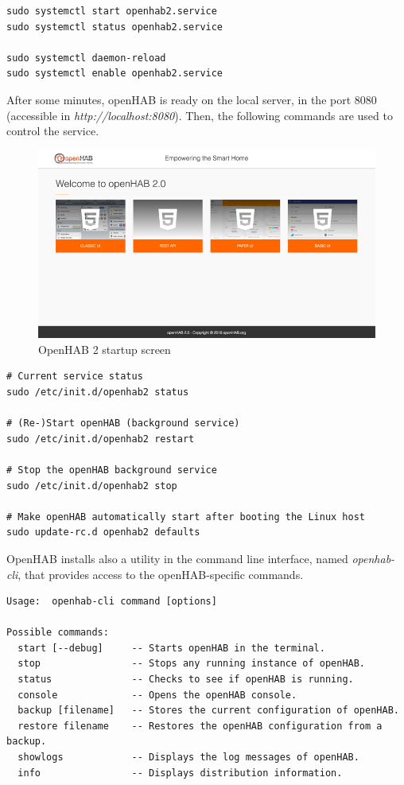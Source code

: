 \begin{lstlisting}[style=Consola]
sudo systemctl start openhab2.service
sudo systemctl status openhab2.service

sudo systemctl daemon-reload
sudo systemctl enable openhab2.service
\end{lstlisting}

After some minutes, openHAB is ready on the local server, in the port 8080 (accessible in \textit{http://localhost:8080}). Then,
the following commands are used to control the service.

\begin{figure}
    \centering
    \includegraphics[width=1\textwidth]{images/Chapter_06/openhab-startup.png}
    \caption{OpenHAB 2 startup screen}
    \label{fig:openhab-startup}
\end{figure}

\begin{lstlisting}[style=Consola]
# Current service status
sudo /etc/init.d/openhab2 status

# (Re-)Start openHAB (background service)
sudo /etc/init.d/openhab2 restart

# Stop the openHAB background service
sudo /etc/init.d/openhab2 stop

# Make openHAB automatically start after booting the Linux host
sudo update-rc.d openhab2 defaults
\end{lstlisting}

OpenHAB installs also a utility in the command line interface, named \textit{openhab-cli}, that provides access to the openHAB-specific
commands.

\begin{lstlisting}[style=Consola]
Usage:  openhab-cli command [options]

Possible commands:
  start [--debug]     -- Starts openHAB in the terminal.
  stop                -- Stops any running instance of openHAB.
  status              -- Checks to see if openHAB is running.
  console             -- Opens the openHAB console.
  backup [filename]   -- Stores the current configuration of openHAB.
  restore filename    -- Restores the openHAB configuration from a backup.
  showlogs            -- Displays the log messages of openHAB.
  info                -- Displays distribution information.
\end{lstlisting}


